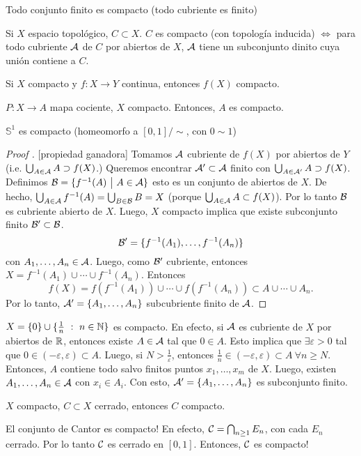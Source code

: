 \begin{eg}
	Todo conjunto finito es compacto (todo cubriente es finito)
\end{eg}

\begin{criterio}
	Si $X$ espacio topológico, $C \subset X$. $C$ es compacto (con topología inducida) $\iff$ para todo cubriente $\mathcal{A}$ de $C$ por abiertos de $X$, $\mathcal{A}$ tiene un subconjunto dinito cuya unión contiene a $C$.
\end{criterio}

\begin{property}[ganadora]
	Si $X$ compacto y $f : X \to Y$ continua, entonces $f(X)$ compacto.
\end{property}

\begin{corollary}
	$P : X \to A$ mapa cociente, $X$ compacto. Entonces, $A$ es compacto.
\end{corollary}

\begin{eg}
	$\mathbb{S}^1$ es compacto (homeomorfo a $[0,1] / \sim$, con $0 \sim 1$)
\end{eg}

\begin{proof}[Proof ][propiedad ganadora]
	Tomamos $\mathcal{A}$ cubriente de $f(X)$ por abiertos de $Y$ (i.e. $\bigcup_{A\in\mathcal{A}} A \supset f(X)$.) Queremos encontrar $\mathcal{A}' \subset \mathcal{A}$ finito con $\bigcup_{A\in\mathcal{A}'} A \supset f(X)$. Definimos $\mathcal{B} = \{f^{-1}(A) \ \big| \ A \in \mathcal{A}\}$ esto es un conjunto de abiertos de $X$. De hecho, $\bigcup_{A\in\mathcal{A}} f^{-1}(A) = \bigcup_{B\in\mathcal{B}} B = X$ (porque $\bigcup_{A\in\mathcal{A}} A \subset f(X)$). Por lo tanto $\mathcal{B}$ es cubriente abierto de $X$. Luego, $X$ compacto implica que existe subconjunto finito $\mathcal{B}' \subset \mathcal{B}$.
	\[ \mathcal{B}' = \{f^{-1}(A_{1}),\dots,f^{-1}(A_{n})\} \]
	con $A_{1},\dots,A_{n} \in \mathcal{A}$. Luego, como $\mathcal{B}'$ cubriente, entonces $X = f^{-1}(A_{1}) \cup \cdots \cup f^{-1}(A_{n})$. Entonces
	\[ f(X) = f(f^{-1}(A_{1})) \cup \cdots \cup f(f^{-1}(A_{n})) \subset A \cup \cdots \cup A_{n}. \]
	Por lo tanto, $\mathcal{A}' = \{A_{1},\dots,A_{n}\}$ subcubriente finito de $\mathcal{A}$.
\end{proof}

\begin{eg}
	$X = \{0\} \cup \{\frac{1}{n} \ : \ n \in \mathbb{N}\}$ es compacto. En efecto, si $\mathcal{A}$ es cubriente de $X$ por abiertos de $\mathbb{R}$, entonces existe $A \in \mathcal{A}$ tal que $0 \in A$. Esto implica que $\exists \varepsilon > 0$ tal que $0 \in (-\varepsilon, \varepsilon) \subset A$. Luego, si $N > \frac{1}{\varepsilon}$, entonces $\frac{1}{n} \in (-\varepsilon, \varepsilon) \subset A \ \forall n \geq N$. Entonces, $A$ contiene todo salvo finitos puntos $x_{1},\dots,x_{m}$ de $X$. Luego, existen $A_{1},\dots,A_{n} \in \mathcal{A}$ con $x_{i} \in A_{i}$. Con esto, $\mathcal{A}' = \{A_{1},\dots,A_{n}\}$ es subconjunto finito.
\end{eg}

\begin{prop}
	$X$ compacto, $C \subset X$ cerrado, entonces $C$ compacto.
\end{prop}

\begin{eg}
	El conjunto de Cantor es compacto! En efecto, $\mathcal{C} = \bigcap_{n \geq 1} E_{n}$, con cada $E_{n}$ cerrado. Por lo tanto $\mathcal{C}$ es cerrado en $[0,1]$. Entonces, $\mathcal{C}$ es compacto!
\end{eg}
